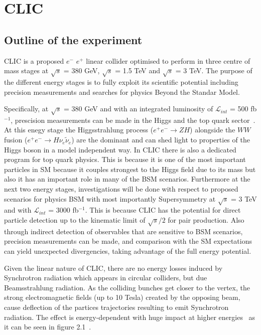 \documentclass[12pt,a4paper]{report}
\begin{document}
\chapter{CLIC}

\section{Outline of the experiment}

CLIC is a proposed $e^{-}$ $e^{+}$ linear collider optimised to perform in three centre of mass stages at 
$\surd s$ = 380 GeV, $\surd s$ = 1.5 TeV and $\surd s$ = 3 TeV. The purpose of the different energy stages is to 
fully exploit its scientific potential including precision measurements and searches for physics Beyond the 
Standar Model.

Specifically, at $\surd s$ = 380 GeV and with an integrated luminosity of $\mathcal{L}_{int}$ = 500 fb$^{-1}$, 
prescision measurements can be made in the Higgs and the top quark sector~\cite{clic2016updated}.
At this enegy stage the Higgsstrahlung
process ($e^{+}e^{-}\rightarrow ZH$) alongside the $WW$ fusion ($e^{+}e^{-}\rightarrow H\nu_{e}\tilde{\nu}_{e}$) 
are the dominant and can shed light to properties of the Higgs boson in a model independent way.
In CLIC there is also a dedicated program for top quark physics. This is because it is one of the most important particles
in SM because it couples strongest to the Higgs field due to its mass but also it has an important role in 
many of the BSM scenarios.
Furthermore at the next two energy stages, investigations will be done with respect to 
proposed scenarios for physics BSM with most 
importantly Supersymmetry at $\surd s$ = 3 TeV and with $\mathcal{L}_{int}$ = 3000 fb$^{-1}$. This  is because CLIC has the potential for direct particle detection up to the 
kinematic limit of $\surd s /2$ for pair production. Also through indirect detection of observables that are sensitive to BSM
scenarios, precision measurements can be made, and comparison with the SM expectations can yield unexpected 
divergencies, 
taking advantage of the full energy potential.



Given the linear nature of CLIC, there are no energy losses induced by Synchrotron radiation which appears in 
circular colliders, but due Beamsstrahlung radiation. As the colliding bunches get closer to the 
vertex, the strong electromagnetic fields (up to 10 Tesla) created by the opposing beam, cause deflection
of the partices trajectories resulting to emit Synchrotron radiation. The effect is energy-dependent with huge
impact at higher energies~\cite{bonvicini1989first} as it can be seen in figure 
2.1~\cite{abramowicz2017higgs}.
\end{document}

